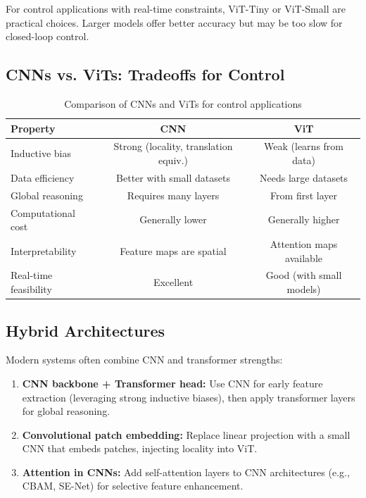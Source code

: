 For control applications with real-time constraints, ViT-Tiny or ViT-Small are practical choices. Larger models offer better accuracy but may be too slow for closed-loop control.

\subsection{CNNs vs. ViTs: Tradeoffs for Control}

\begin{table}[htbp]
\centering
\caption{Comparison of CNNs and ViTs for control applications}
\label{tab:cnn_vs_vit}
\begin{tabular}{lcc}
\toprule
\textbf{Property} & \textbf{CNN} & \textbf{ViT} \\
\midrule
Inductive bias & Strong (locality, translation equiv.) & Weak (learns from data) \\
Data efficiency & Better with small datasets & Needs large datasets \\
Global reasoning & Requires many layers & From first layer \\
Computational cost & Generally lower & Generally higher \\
Interpretability & Feature maps are spatial & Attention maps available \\
Real-time feasibility & Excellent & Good (with small models) \\
\bottomrule
\end{tabular}
\end{table}


\subsection{Hybrid Architectures}

Modern systems often combine CNN and transformer strengths:

\begin{enumerate}
    \item \textbf{CNN backbone + Transformer head:} Use CNN for early feature extraction (leveraging strong inductive biases), then apply transformer layers for global reasoning.

    \item \textbf{Convolutional patch embedding:} Replace linear projection with a small CNN that embeds patches, injecting locality into ViT.

    \item \textbf{Attention in CNNs:} Add self-attention layers to CNN architectures (e.g., CBAM, SE-Net) for selective feature enhancement.
\end{enumerate}

